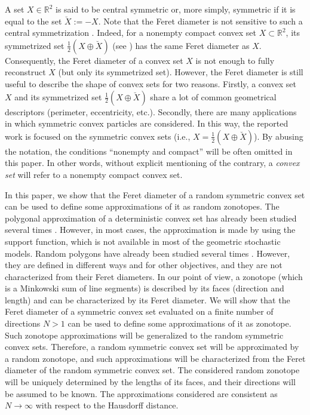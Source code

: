 \documentclass[numbers,compress,v1.0.1]{vmsta}
\theoremstyle{definition}
\begin{document}
A set $X\in\mathbb{R}^2$ is said to be central symmetric or, more
simply, symmetric if it is equal to the set $\breve{X}:=-X$. Note that
the Feret diameter is not sensitive to such a central symmetrization
\cite{molchanovLivre}. Indeed, for a nonempty compact convex set
$X\subset\mathbb{R}^2$, its symmetrized set $\frac{1}{2}(X\oplus\breve
{X})$ (see \citep{molch95,hoffmann2007weak}) has the same Feret
diameter as $X$.
Consequently, the Feret diameter of a convex set $X$ is not enough to
fully reconstruct $X$ (but only its symmetrized set).
However, the Feret diameter is still useful to describe the shape of
convex sets for two reasons. Firstly, a convex set $X$ and its
symmetrized set $\frac{1}{2}(X\oplus\breve{X})$ share a lot of common
geometrical descriptors (perimeter, eccentricity, etc.). Secondly,
there are many applications in which symmetric convex particles are
considered. In this way, the reported work is focused on the symmetric
convex sets (i.e., $X= \frac{1}{2}(X\oplus\breve{X})$). By abusing the
notation, the conditions ``nonempty and compact'' will be often omitted
in this paper. In other words, without explicit mentioning of the
contrary, a \textit{convex set} will refer to a nonempty compact convex
set.

In this paper, we show that the Feret diameter of a random symmetric
convex set can be used to define some approximations of it as random
zonotopes. The polygonal approximation of a deterministic convex set
has already been studied several times \citep
{mcclure1975polygonal,glasauer1996asymptotic,bronstein2008approximation,campi1994approximation}.
However, in most cases, the approximation is made by using the support
function, which is not available in most of the geometric stochastic
models. Random polygons have already been studied several times \citep
{dafnis2009asymptotic,barany2010variance,miles1964random}. However,
they are defined in different ways and for other objectives, and they
are not characterized from their Feret diameters. In our point of view,
a zonotope (which is a Minkowski sum of line segments) is described by
its faces (direction and length) and can be characterized by its Feret
diameter. We will show that the Feret diameter of a symmetric convex
set evaluated on a finite number of directions $N>1$ can be used to
define some approximations of it as zonotope. Such zonotope
approximations will be generalized to the random symmetric convex sets.
Therefore, a random symmetric convex set will be approximated by a
random zonotope, and such approximations will be characterized from the
Feret diameter of the random symmetric convex set. The considered
random zonotope will be uniquely determined by the lengths of its
faces, and their directions will be assumed to be known. The
approximations considered are consistent as $N\rightarrow\infty$ with
respect to the Hausdorff distance.
\end{document}
